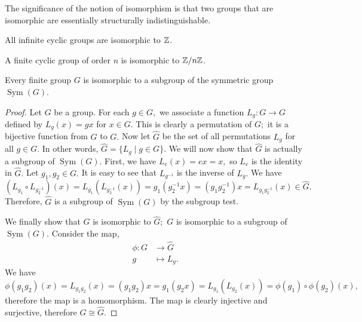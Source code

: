 \begin{remark}
    The significance of the notion of isomorphism is that two groups that are isomorphic are essentially structurally indistinguishable. %
\end{remark}

\begin{example}
    All infinite cyclic groups are isomorphic to $\mathbb Z$.

    A finite cyclic group of order $n$ is isomorphic to $\mathbb Z/n\mathbb Z$.
\end{example}
\begin{theorem}
    Every finite group $G$ is isomorphic to a subgroup of the symmetric group $\operatorname{Sym}(G)$.
\end{theorem}
\begin{proof}
    Let $G$ be a group. For each $g\in G,$ we associate a function $L_g:G\to G$ defined by $L_g(x)=gx$ for $x\in G.$ This is clearly a permutation of $G;$ it is a bijective function from $G$ to $G.$ 
    Now let $\hat{G}$ be the set of all permutations $L_g$ for all $g\in G.$ In other words,
    $\hat{G}=\{L_g\mid g\in G\}.$ We will now show that $\hat{G}$ is actually a subgroup of $\operatorname{Sym}(G).$ First, we have $L_e(x)=ex=x,$ so $L_e$ is the identity in $\hat{G}.$ Let $g_1,g_2\in G.$ It is easy to see that $L_{g^{-1}}$ is the inverse of $L_g.$ We have $(L_{g_1}\circ L_{g_2^{-1}})(x)=L_{g_1}(L_{g_2^{-1}}(x))=g_1(g_2^{-1}x)=(g_1g_2^{-1})x=L_{g_1g_2^{-1}}(x)\in \hat{G}.$ Therefore, $\hat{G}$ is a subgroup of $\operatorname{Sym}(G)$ by the subgroup test.

    We finally show that $G$ is isomorphic to $\hat{G};$ $G$ is isomorphic to a subgroup of $\operatorname{Sym}(G).$
    Consider the map,
    \begin{align*}
        \phi : G&\to \hat{G}
        \\ g & \mapsto L_g.
    \end{align*}
    We have
    $$\phi(g_1g_2)(x)=L_{g_1g_2}(x)=(g_1g_2)x=g_1(g_2x)=L_{g_1}(L_{g_2}(x))=\phi(g_1)\circ \phi(g_2)(x),$$
    therefore the map is a homomorphism. 
    The map is clearly injective and surjective, therefore $G\cong \hat{G}.$
\end{proof}

